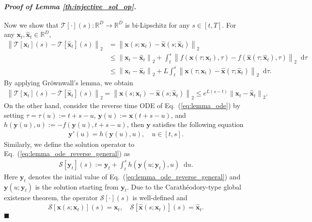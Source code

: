 \documentclass{article} \usepackage{iclr2024_coNFErence,times}
\def\eqref#1{equation~\ref{#1}}
\newcommand{\norm}[1]{\left\lVert#1\right\rVert}
\newenvironment{myproof}[2]{\paragraph{\textit{Proof of {#1} {#2}. }}}{\hfill$\blacksquare$}
\def\eqref#1{(\ref{#1})}
\def\eqref#1{(\ref{#1})}
\theoremstyle{definition}
\theoremstyle{remark}
\newcommand*\diff{\mathop{}\!\mathrm{d}}
\begin{document}
\begin{myproof}{Lemma}{\ref{th:injective_sol_op}}
    
    Now we show that $\mathcal{T}[\cdot](s)\colon\mathbb{R}^D\rightarrow\mathbb{R}^D$ is bi-Lipschitz for any $s\in[t,T]$. For any $\mathbf{x}_t, \hat{\mathbf{x}}_t\in\mathbb{R}^D$,
    \begin{align*}
       \norm{\mathcal{T}[\mathbf{x}_t](s) -\mathcal{T}[\hat{\mathbf{x}}_t](s)}_2 \nonumber
       &=\norm{\mathbf{x}(s;\mathbf{x}_t)-\hat{\mathbf{x}}(s;\hat{\mathbf{x}}_t)}_2
       \\& \leq \norm{\mathbf{x}_t-\hat{\mathbf{x}}_t}_2+ \int_{t}^{s}\norm{f(\mathbf{x}(\tau;\mathbf{x}_t),\tau)-f(\hat{\mathbf{x}}(\tau;\hat{\mathbf{x}}_t),\tau)}_2\diff \tau \nonumber
       \\& \leq \norm{\mathbf{x}_t-\hat{\mathbf{x}}_t}_2+ L\int_{t}^{s}\norm{\mathbf{x}(\tau;\mathbf{x}_t)-\hat{\mathbf{x}}(\tau;\hat{\mathbf{x}}_t)}_2\diff \tau. \nonumber
   \end{align*}
    By applying Gr\"ownwall's lemma, we obtain 
\begin{align}\label{eq:one_side_lip}
       \norm{\mathcal{T}[\mathbf{x}_t](s) -\mathcal{T}[\hat{\mathbf{x}}_t](s)}_2 
       =\norm{\mathbf{x}(s;\mathbf{x}_t)-\hat{\mathbf{x}}(s;\hat{\mathbf{x}}_t)}_2 \leq e^{L(s-t)}\norm{\mathbf{x}_t-\hat{\mathbf{x}}_t}_2. 
   \end{align}    
    On the other hand, consider the reverse time ODE of Eq.~\eqref{eq:lemma_ode} by setting $\tau=\tau(u):=t+s-u$, 
    $\mathbf{y}(u):=\mathbf{x}(t+s-u)$, and $h(\mathbf{y}(u), u):=-f(\mathbf{y}(u), t+s-u)$, then $\mathbf{y}$ satisfies the following equation
    \begin{align}\label{eq:lemma_ode_reverse_general}
        \mathbf{y}'(u)=h(\mathbf{y}(u), u), \quad u\in[t,s].
    \end{align}
    Similarly, we define the solution operator to Eq.~\eqref{eq:lemma_ode_reverse_general} as 
   \begin{align}\label{eq:sol_op_reverse}
       \mathcal{S}[\mathbf{y}_t](s):=\mathbf{y}_t+\int_{t}^{s}h(\mathbf{y}(u;\mathbf{y}_t), u)\diff u. 
   \end{align}    
    Here $\mathbf{y}_t$ denotes the initial value of Eq.~\eqref{eq:lemma_ode_reverse_general} and $\mathbf{y}(u;\mathbf{y}_t)$ is the solution starting from $\mathbf{y}_t$. Due to the Carath\'eodory-type global existence theorem, the operator $\mathcal{S}[\cdot](s)$ is well-defined and 
    \begin{align*}
        \mathcal{S}[\mathbf{x}(s;\mathbf{x}_t)](s)=\mathbf{x}_t,\quad \mathcal{S}[\hat{\mathbf{x}}(s;\mathbf{x}_t)](s)=\hat{\mathbf{x}}_t. 

\end{align*}
\end{myproof}
\end{document}
